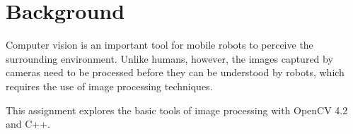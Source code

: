 \section{Background}

Computer vision is an important tool for mobile robots to perceive the surrounding environment. Unlike humans, however, the images captured by cameras need to be processed before they can be understood by robots, which requires the use of image processing techniques.

This assignment explores the basic tools of image processing with OpenCV 4.2 and C++.
